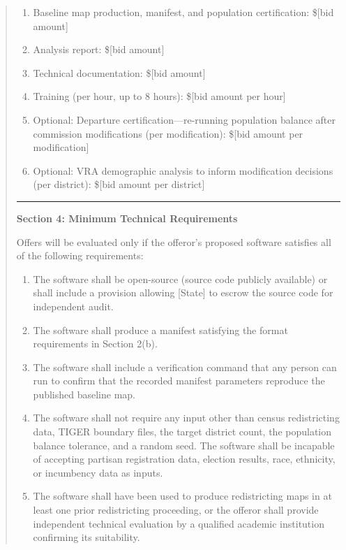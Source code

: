 \begin{quote}
\begin{enumerate}[label=(\alph*)]
  \item Baseline map production, manifest, and population certification: \$[bid amount]
  \item Analysis report: \$[bid amount]
  \item Technical documentation: \$[bid amount]
  \item Training (per hour, up to 8 hours): \$[bid amount per hour]
  \item Optional: Departure certification---re-running population balance after commission modifications (per modification): \$[bid amount per modification]
  \item Optional: VRA demographic analysis to inform modification decisions (per district): \$[bid amount per district]
\end{enumerate}

\rule{\linewidth}{0.4pt}

\textbf{Section 4: Minimum Technical Requirements}

Offers will be evaluated only if the offeror's proposed software satisfies all of the following requirements:

\begin{enumerate}[label=(\alph*)]
  \item The software shall be open-source (source code publicly available) or shall include a provision allowing [State] to escrow the source code for independent audit.
  \item The software shall produce a manifest satisfying the format requirements in Section 2(b).
  \item The software shall include a verification command that any person can run to confirm that the recorded manifest parameters reproduce the published baseline map.
  \item The software shall not require any input other than census redistricting data, TIGER boundary files, the target district count, the population balance tolerance, and a random seed. The software shall be incapable of accepting partisan registration data, election results, race, ethnicity, or incumbency data as inputs.
  \item The software shall have been used to produce redistricting maps in at least one prior redistricting proceeding, or the offeror shall provide independent technical evaluation by a qualified academic institution confirming its suitability.
\end{enumerate}


\end{quote}
